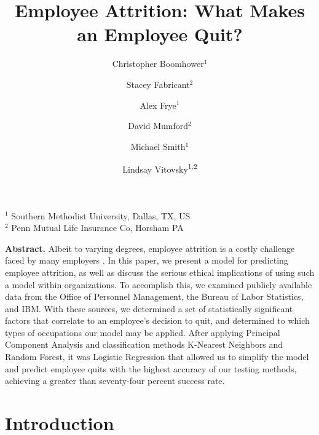 \documentclass[10pt]{article}
\begin{document}
\title{\bf Employee Attrition: What Makes an Employee Quit?}
\author{
	Christopher Boomhower$^1$
	\and
	Stacey Fabricant$^2$
	\and
	Alex Frye$^1$
	\and
	David Mumford$^2$
	\and
	Michael Smith$^1$
	\and
	Lindsay Vitovsky\textsuperscript{1,2}
}
\date{}
\maketitle{}

\begin{center}
{$^1$ Southern Methodist University, Dallas, TX, US\\$^2$ Penn Mutual Life Insurance Co, Horsham PA}
\end{center}

\renewenvironment{abstract}
               {\list{}{\rightmargin\leftmargin}%
                \item[\textbf{\hspace{10mm}Abstract.}]\relax}
               {\endlist}


\begin{abstract}\fontsize{9}\noindent Albeit to varying degrees, employee attrition is a costly challenge faced by many employers \cite{kantor}.  In this paper, we present a model for predicting employee attrition, as well as discuss the serious ethical implications of using such a model within organizations. To accomplish this, we examined publicly available data from the Office of Personnel Management, the Bureau of Labor Statistics, and IBM.  With these sources, we determined a set of statistically significant factors that correlate to an employee’s decision to quit, and determined to which types of occupations our model may be applied.  After applying Principal Component Analysis and classification methods K-Nearest Neighbors and Random Forest, it was Logistic Regression that allowed us to simplify the model and predict employee quits with the highest accuracy of our testing methods, achieving a greater than seventy-four percent success rate.  \end{abstract}

 
\section{Introduction}
\end{document}
